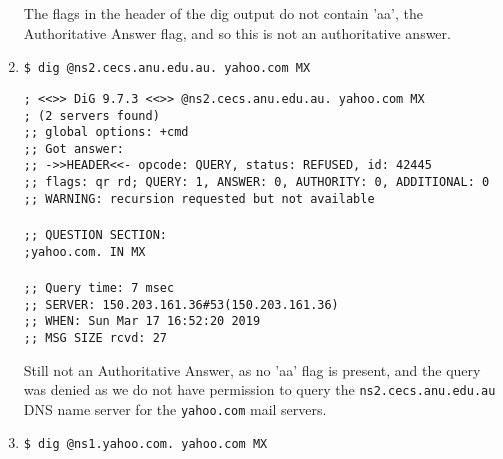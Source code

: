 \documentclass[a4paper,11pt]{article}
\newcommand{\code}{\texttt}
\begin{document}
\begin{enumerate}[leftmargin=*]
	The flags in the header of the dig output do not contain 'aa', the Authoritative Answer flag, and so this is not an authoritative answer.

	\pagebreak

	\item \code{\$ dig @ns2.cecs.anu.edu.au. yahoo.com MX}

	\code{; <<>> DiG 9.7.3 <<>> @ns2.cecs.anu.edu.au. yahoo.com MX\\
	; (2 servers found)\\
	;; global options: +cmd\\
	;; Got answer:\\
	;; ->>HEADER<<- opcode: QUERY, status: REFUSED, id: 42445\\
	;; flags: qr rd; QUERY: 1, ANSWER: 0, AUTHORITY: 0, ADDITIONAL: 0\\
	;; WARNING: recursion requested but not available\\
	\\
	;; QUESTION SECTION:\\
	;yahoo.com.			IN	MX\\
	\\
	;; Query time: 7 msec\\
	;; SERVER: 150.203.161.36\#53(150.203.161.36)\\
	;; WHEN: Sun Mar 17 16:52:20 2019\\
	;; MSG SIZE  rcvd: 27\\}

	Still not an Authoritative Answer, as no 'aa' flag is present, and the query was denied as we do not have permission to query the \code{ns2.cecs.anu.edu.au} DNS name server for the \code{yahoo.com} mail servers.

	\item \code{\$ dig @ns1.yahoo.com. yahoo.com MX}


\end{enumerate}
\end{document}
